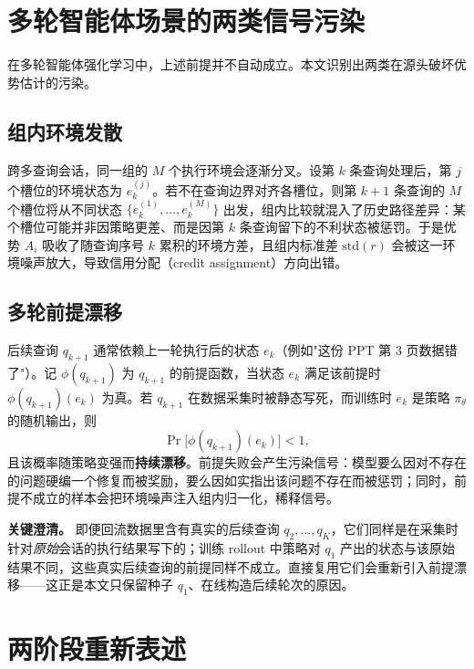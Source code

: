 \section{多轮智能体场景的两类信号污染}
\label{sec:setup-corruption}

在多轮智能体强化学习中，上述前提并不自动成立。本文识别出两类在源头破坏优势估计的污染。

\subsection{组内环境发散}
\label{sec:setup-divergence}

跨多查询会话，同一组的 $M$ 个执行环境会逐渐分叉。设第 $k$ 条查询处理后，第 $j$ 个槽位的环境状态为 $e_k^{(j)}$。若不在查询边界对齐各槽位，则第 $k{+}1$ 条查询的 $M$ 个槽位将从不同状态 $\{e_k^{(1)},\dots,e_k^{(M)}\}$ 出发，组内比较就混入了历史路径差异：某个槽位可能并非因策略更差、而是因第 $k$ 条查询留下的不利状态被惩罚。于是优势 $A_i$ 吸收了随查询序号 $k$ 累积的环境方差，且组内标准差 $\mathrm{std}(r)$ 会被这一环境噪声放大，导致信用分配（credit assignment）方向出错。

\subsection{多轮前提漂移}
\label{sec:setup-premise-drift}

后续查询 $q_{k+1}$ 通常依赖上一轮执行后的状态 $e_k$（例如"这份 PPT 第 3 页数据错了"）。记 $\phi(q_{k+1})$ 为 $q_{k+1}$ 的前提函数，当状态 $e_k$ 满足该前提时 $\phi(q_{k+1})(e_k)$ 为真。若 $q_{k+1}$ 在数据采集时被静态写死，而训练时 $e_k$ 是策略 $\pi_\theta$ 的随机输出，则
\begin{equation}
\label{eq:premise}
\Pr\big[\phi(q_{k+1})(e_k)\big] < 1,
\end{equation}
且该概率随策略变强而\textbf{持续漂移}。前提失败会产生污染信号：模型要么因对不存在的问题硬编一个修复而被奖励，要么因如实指出该问题不存在而被惩罚；同时，前提不成立的样本会把环境噪声注入组内归一化，稀释信号。

\textbf{关键澄清。} 即便回流数据里含有真实的后续查询 $q_2,\dots,q_K$，它们同样是在采集时针对\textit{原始}会话的执行结果写下的；训练 rollout 中策略对 $q_1$ 产出的状态与该原始结果不同，这些真实后续查询的前提同样不成立。直接复用它们会重新引入前提漂移——这正是本文只保留种子 $q_1$、在线构造后续轮次的原因。

\section{两阶段重新表述}
\label{sec:setup-reframe}

